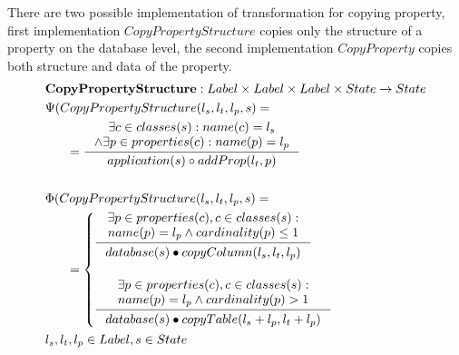\documentclass[11pt]{article}
\begin{document}
There are two possible implementation of transformation for copying property, first implementation $CopyPropertyStructure$ copies only the structure of a property on the database level, the second implementation $CopyProperty $ copies both structure and data of the property.
\begin{align*}
&	\mathbf{CopyPropertyStructure} : Label \times Label \times Label \times State \rightarrow State \\
&	\Psi(CopyPropertyStructure(l_s, l_t, l_p, s) = \\
& \;\;\;\;\;\; =\inference{\exists c \in classes(s) : name(c) = l_s \\ \wedge \exists p \in properties(c) : name(p) = l_p }{application(s) \circ addProp(l_t, p)} 
	\\\\
&	\Phi(CopyPropertyStructure(l_s, l_t, l_p, s) = \\
& \;\;\;\;\;\; =\begin{cases}
    \inference{\exists p \in properties(c), c \in classes(s) : \\ name(p) = l_p \wedge cardinality(p) \leq 1 }{\begin{gathered}
			database(s) \bullet copyColumn(l_s, l_t, l_p) 			\end{gathered}} \\ \\
		\inference{\exists p \in properties(c), c \in classes(s) : \\ name(p) = l_p \wedge cardinality(p) > 1}{\begin{gathered}
			database(s) \bullet copyTable(l_s + l_p, l_t + l_p) 			\end{gathered}}
 \end{cases}\\
& l_s, l_t, l_p \in Label, s \in State
\end{align*}
\end{document}
